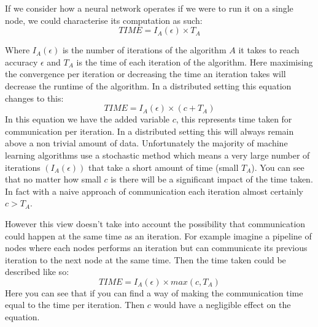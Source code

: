 If we consider how a neural network operates if we were to run it on a single
node, we could characterise its computation as such:
\begin{equation}
    TIME = I_A (\epsilon) \times T_A 
\end{equation}

Where \(I_A(\epsilon)\) is the number of iterations of the algorithm \(A\) it
takes to reach accuracy \(\epsilon\) and \(T_A\) is the time of each iteration
of the algorithm. Here maximising the convergence per iteration or decreasing
the time an iteration takes will decrease the runtime of the algorithm. In a
distributed setting this equation changes to this:
\begin{equation}
    TIME = I_A (\epsilon) \times (c + T_A)  
\end{equation}
In this equation we have the added variable \(c\), this represents time taken
for communication per iteration. In a distributed setting this will always
remain above a non trivial amount of data. Unfortunately the majority of machine
learning algorithms use a stochastic method which means a very large number of
iterations \((I_A(\epsilon))\) that take a short amount of time (small \(T_A\)).
You can see that no matter how small \(c\) is there will be a significant impact
of the time taken. In fact with a naive approach of communication each iteration
almost certainly \(c > T_A\).

However this view doesn't take into account the possibility that communication
could happen at the same time as an iteration. For example imagine a pipeline of
nodes where each nodes performs an iteration but can communicate its previous
iteration to the next node at the same time. Then the time taken could be
described like so:
\begin{equation}
    TIME = I_A (\epsilon) \times max(c, T_A)
\end{equation}
Here you can see that if you can find a way of making the communication time
equal to the time per iteration. Then \(c\) would have a negligible effect on
the equation.





